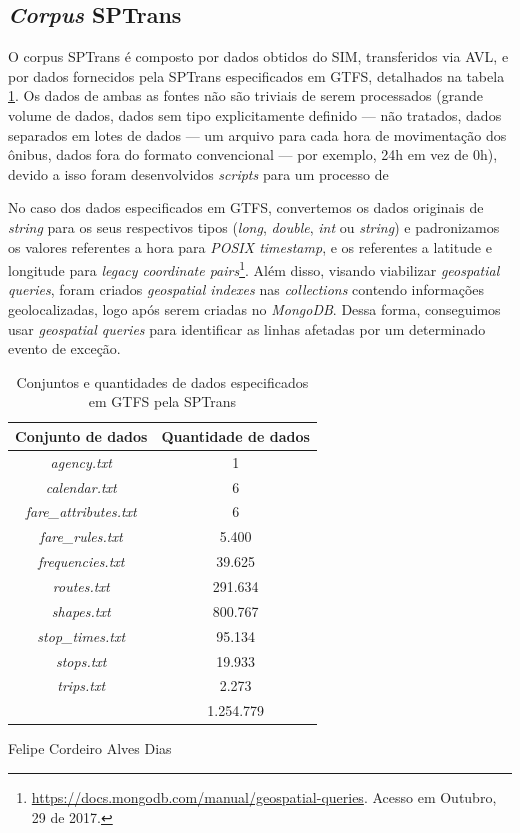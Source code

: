 \documentclass[
	12pt,				%
	oneside,			%
	a4paper,			%
	english,			%
	brazil				%
	]{abntex2ppgsi}
\begin{document}
\subsection{\textit{Corpus} SPTrans}
\label{CorpusSPTrans}

O corpus SPTrans é composto por dados obtidos do SIM, transferidos via AVL, e por dados fornecidos pela SPTrans especificados em GTFS, detalhados na tabela \ref{tab:gtfs}. Os dados de ambas as fontes não são triviais de serem processados (grande volume de dados, dados sem tipo explicitamente definido --- não tratados, dados separados em lotes de dados --- um arquivo para cada hora de movimentação dos ônibus, dados fora do formato convencional --- por exemplo, 24h em vez de 0h), devido a isso foram desenvolvidos \textit{scripts} para um processo de  

No caso dos dados especificados em GTFS, convertemos os dados originais de \textit{string} para os seus respectivos tipos (\textit{long}, \textit{double}, \textit{int} ou \textit{string}) e padronizamos os valores referentes a hora para \textit{POSIX timestamp}, e os referentes a latitude e longitude para  \textit{legacy coordinate pairs}\footnote{\label{geoMongo}\url{https://docs.mongodb.com/manual/geospatial-queries}. Acesso em Outubro, 29 de 2017.}. Além disso, visando viabilizar \textit{geospatial queries}, foram criados \textit{geospatial indexes} nas \textit{collections} contendo informações geolocalizadas, logo após serem criadas no \textit{MongoDB}. Dessa forma, conseguimos usar \textit{geospatial queries} para identificar as linhas afetadas por um determinado evento de exceção.

\begin{table}[!htb]
\centering
\caption{Conjuntos e quantidades de dados especificados em GTFS pela SPTrans}
	\label{tab:gtfs}
\begin{tabular}{c|c}
\toprule
\textbf{Conjunto de dados} & \textbf {Quantidade de dados} \\ 
\midrule
\textit{agency.txt} & 1 \\ 
\hline
\textit{calendar.txt} & 6 \\ 
\hline
\textit{fare\_attributes.txt} & 6 \\ 
\hline
\textit{fare\_rules.txt} & 5.400 \\
\hline
\textit{frequencies.txt} & 39.625 \\
\hline
\textit{routes.txt} & 291.634 \\
\hline
\textit{shapes.txt} & 800.767 \\
\hline
\textit{stop\_times.txt} & 95.134 \\  
\hline
\textit{stops.txt} & 19.933 \\ 
\hline
\textit{trips.txt} & 2.273 \\
\midrule
{} & 1.254.779 \\
\bottomrule
\end{tabular}
 Felipe Cordeiro Alves Dias
\end{table}
\end{document}
